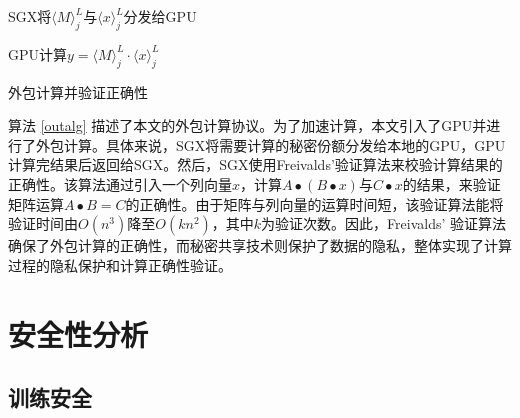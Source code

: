 \begin{algorithm}[H]
	\SetAlgoLined
	
	
	SGX将$\langle M\rangle_j^L$与$\langle x\rangle_j^L$分发给GPU
	
	GPU计算$y = \langle M\rangle_j^L\cdot \langle x\rangle_j^L$
	
	
	\caption{外包计算并验证正确性}
	\label{outalg}
\end{algorithm}


算法 \ref{outalg} 描述了本文的外包计算协议。为了加速计算，本文引入了GPU并进行了外包计算。具体来说，SGX将需要计算的秘密份额分发给本地的GPU，GPU计算完结果后返回给SGX。然后，SGX使用Freivalds'验证算法\cite{Random_Algorithm}来校验计算结果的正确性。该算法通过引入一个列向量$x$，计算$A∙(B∙x)$与$C∙x$的结果，来验证矩阵运算$A∙B=C$的正确性。由于矩阵与列向量的运算时间短，该验证算法能将验证时间由$O(n^3)$降至$O(kn^2)$，其中$k$为验证次数。因此，Freivalds' 验证算法确保了外包计算的正确性，而秘密共享技术则保护了数据的隐私，整体实现了计算过程的隐私保护和计算正确性验证。

\section{安全性分析}


\subsection{训练安全}

